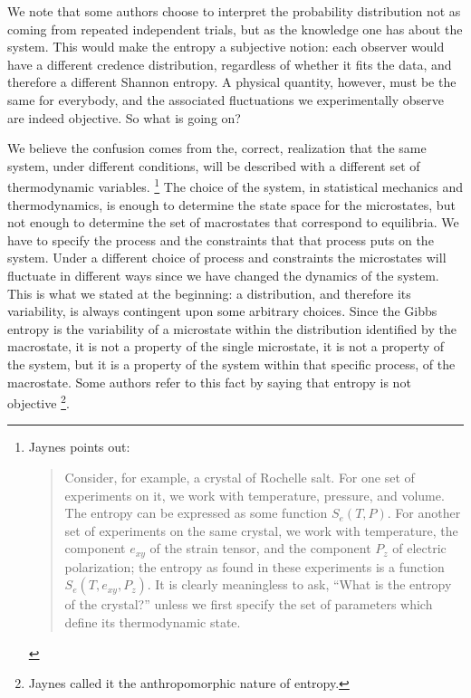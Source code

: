 \documentclass[iopart]{revtex4-1}
\begin{document}
We note that some authors choose to interpret the probability distribution not as coming from repeated independent trials, but as the knowledge one has about the system. This would make the entropy a subjective notion: each observer would have a different credence distribution, regardless of whether it fits the data, and therefore a different Shannon entropy. A physical quantity, however, must be the same for everybody, and the associated fluctuations we experimentally observe are indeed objective. So what is going on?

We believe the confusion comes from the, correct, realization that the same system, under different conditions, will be described with a different set of thermodynamic variables. \footnote{Jaynes\cite{Jaynes} points out:
\begin{quote}
 		Consider, for example, a crystal of Rochelle salt. For one set of experiments on it, we work with temperature, pressure, and volume. The entropy can be expressed as some function $S_e(T,P)$. For another set of experiments on the same crystal, we work with temperature, the component $e_{xy}$ of the strain tensor, and the component $P_z$ of electric polarization; the entropy as found in these experiments is a function $S_e(T,e_{xy},P_z)$. It is clearly  meaningless to ask, ``What is the entropy of the crystal?''  unless we first specify the set of parameters which define its thermodynamic state.
\end{quote}}
The choice of the system, in statistical mechanics and thermodynamics, is enough to determine the state space for the microstates, but not enough to determine the set of macrostates that correspond to equilibria. We have to specify the process and the constraints that that process puts on the system. Under a different choice of process and constraints the microstates will fluctuate in different ways since we have changed the dynamics of the system. This is what we stated at the beginning: a distribution, and therefore its variability, is always contingent upon some arbitrary choices. Since the Gibbs entropy is the variability of a microstate within the distribution identified by the macrostate, it is not a property of the single microstate, it is not a property of the system, but it is a property of the system within that specific process, of the macrostate. Some authors refer to this fact by saying that entropy is not objective \footnote{Jaynes\cite{Jaynes,Jaynes2} called it the anthropomorphic nature of entropy.}. 
\end{document}
